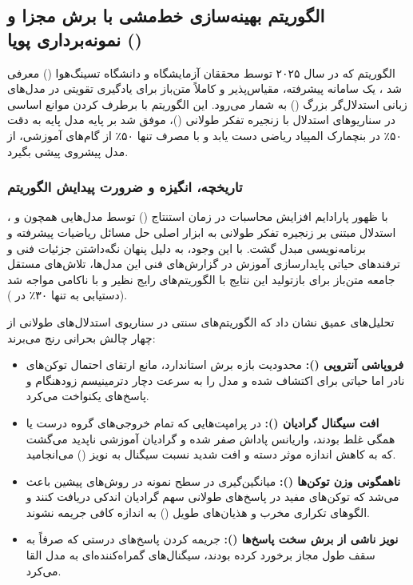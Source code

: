\subsection{الگوریتم بهینه‌سازی خط‌مشی با برش مجزا و نمونه‌برداری پویا ()}

الگوریتم  که در سال ۲۰۲۵ توسط محققان آزمایشگاه  و دانشگاه تسینگ‌هوا () معرفی شد \cite{yu2025dapo}، یک سامانه پیشرفته، مقیاس‌پذیر و کاملاً متن‌باز برای یادگیری تقویتی در مدل‌های زبانی استدلال‌گر بزرگ () به شمار می‌رود. این الگوریتم با برطرف کردن موانع اساسی در سناریوهای استدلال با زنجیره تفکر طولانی ()، موفق شد بر پایه مدل پایه  \cite{yang2024qwen25} به دقت ۵۰٪ در بنچمارک المپیاد ریاضی  دست یابد و با مصرف تنها ۵۰٪ از گام‌های آموزشی، از مدل پیشروی  \cite{guo2025deepseek} پیشی بگیرد.

\subsubsection*{تاریخچه، انگیزه و ضرورت پیدایش الگوریتم}

با ظهور پارادایم افزایش محاسبات در زمان استنتاج () توسط مدل‌هایی همچون  \cite{openai2024learning} و  \cite{guo2025deepseek}، استدلال مبتنی بر زنجیره تفکر طولانی به ابزار اصلی حل مسائل ریاضیات پیشرفته و برنامه‌نویسی مبدل گشت. با این وجود، به دلیل پنهان نگه‌داشتن جزئیات فنی و ترفندهای حیاتی پایدارسازی آموزش در گزارش‌های فنی این مدل‌ها، تلاش‌های مستقل جامعه متن‌باز برای بازتولید این نتایج با الگوریتم‌های رایج نظیر  \cite{shao2024deepseekmath} و  \cite{schulman2017proximal} با ناکامی مواجه شد (دستیابی به تنها ۳۰٪ در ). 

تحلیل‌های عمیق نشان داد که الگوریتم‌های سنتی در سناریوی استدلال‌های طولانی از چهار چالش بحرانی رنج می‌برند:
\begin{itemize}
    \item \textbf{فروپاشی آنتروپی ():} محدودیت بازه برش استاندارد، مانع ارتقای احتمال توکن‌های نادر اما حیاتی برای اکتشاف شده و مدل را به سرعت دچار دترمینیسم زودهنگام و پاسخ‌های یکنواخت می‌کرد.
    \item \textbf{افت سیگنال گرادیان ():} در پرامپت‌هایی که تمام خروجی‌های گروه درست یا همگی غلط بودند، واریانس پاداش صفر شده و گرادیان آموزشی ناپدید می‌گشت که به کاهش اندازه موثر دسته و افت شدید نسبت سیگنال به نویز () می‌انجامید.
    \item \textbf{ناهمگونی وزن توکن‌ها ():} میانگین‌گیری در سطح نمونه در روش‌های پیشین باعث می‌شد که توکن‌های مفید در پاسخ‌های طولانی سهم گرادیان اندکی دریافت کنند و الگوهای تکراری مخرب و هذیان‌های طویل () به اندازه کافی جریمه نشوند.
    \item \textbf{نویز ناشی از برش سخت پاسخ‌ها ():} جریمه کردن پاسخ‌های درستی که صرفاً به سقف طول مجاز برخورد کرده بودند، سیگنال‌های گمراه‌کننده‌ای به مدل القا می‌کرد.
\end{itemize}

